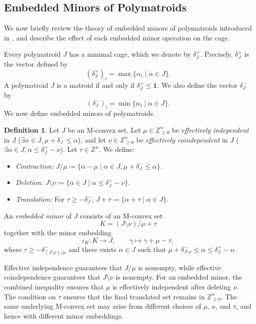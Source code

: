 \documentclass[11pt]{article}
\theoremstyle{definition}
\newtheorem{definition}[theorem]{Definition}
\theoremstyle{remark}
\newcommand{\Zgeqn}{\mathbb{Z}_{\geq 0}^n}     %
\newcommand{\delplus}{\delta_J^+}
\newcommand{\delminus}{\delta_J^-}
\newcommand{\ones}{\textbf{1}}
\begin{document}
\subsection{Embedded Minors of Polymatroids}
We now briefly review the theory of embedded minors of polymatroids introduced in \cite{baker2025representationtheorypolymatroids}, and describe the effect of each embedded minor operation on the cage.

Every polymatroid $J$ has a minimal cage, which we denote by $\delplus$. Precisely, $\delplus$ is the vector defined by \[
(\delplus)_i = \max \{\alpha_i \mid \alpha \in J \}.
\]
A polymatroid $J$ is a matroid if and only if $\delplus \leq \ones$. We also define the vector $\delminus$ by \[
(\delminus)_i = \min \{\alpha_i \mid \alpha \in J \}.
\]
We now define embedded minors of polymatroids.

\begin{definition} \label{def:embedded_minor}
Let $J$ be an M-convex set. Let $\mu\in\Zgeqn$ be \emph{effectively independent} in $J$ ($\exists \alpha \in J, \mu +\delminus \leq \alpha$), and let $\nu\in\Zgeqn$ be \emph{effectively coindependent} in $J$ ($\exists \alpha \in J, \alpha \leq \delplus-\nu$). Let $\tau \in \mathbb{Z}^n$. We define:
\begin{itemize}
\item \emph{Contraction:} $J/\mu \coloneqq \{ \alpha - \mu \mid \alpha \in J, \mu + \delminus \leq \alpha\}$.
\item \emph{Deletion:} $J\setminus \nu \coloneqq \{\alpha \in J \mid \alpha \leq \delplus - \nu \}$.
\item \emph{Translation:} For $\tau \geq -\delminus$, $J + \tau \coloneqq \{ \alpha + \tau \mid \alpha \in J \}$.
\end{itemize}

An \emph{embedded minor} of $J$ consists of an M-convex set
\[
    K=(J\setminus\nu)/\mu+\tau
\]
together with the minor embedding
\[
    \iota_K\colon K\longrightarrow J,
    \qquad
    \gamma\longmapsto\gamma+\mu-\tau,
\]
where $\tau\geq-\delta^-_{(J\setminus\nu)/\mu}$ and there exists $\alpha\in J$ such that $\mu+\delta^-_{J\setminus\nu} \leq\alpha\leq\delta_J^+-\nu.$
\end{definition}

Effective independence guarantees that $J/\mu$ is nonempty, while
effective coindependence guarantees that $J\setminus\nu$ is nonempty.
For an embedded minor, the combined inequality ensures that $\mu$ is
effectively independent after deleting $\nu$. The condition on $\tau$
ensures that the final translated set remains in
$\mathbb{Z}_{\geq 0}^n$. The same underlying M-convex set may arise
from different choices of $\mu$, $\nu$, and $\tau$, and hence with
different minor embeddings.
\end{document}

